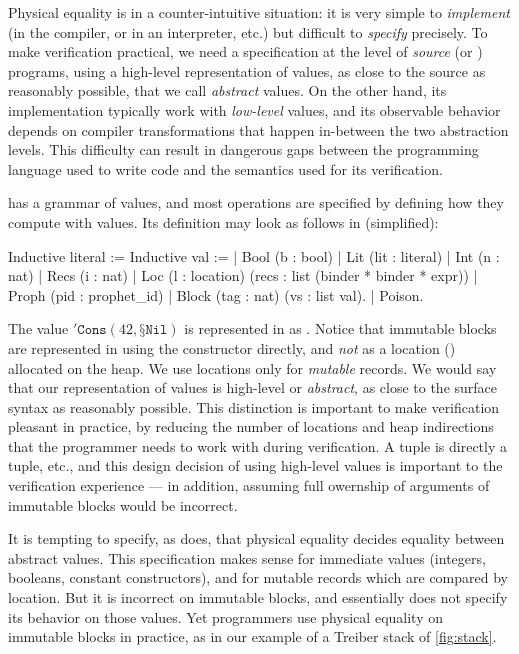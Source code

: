 Physical equality is in a counter-intuitive situation: it is very simple to \emph{implement} (in the \OCaml compiler, or in an interpreter, etc.) but difficult to \emph{specify} precisely. To make verification practical, we need a specification at the level of \emph{source} \OCaml (or \Zoo) programs, using a high-level representation of values, as close to the source as reasonably possible, that we call \emph{abstract} values. On the other hand, its implementation typically work with \emph{low-level} values, and its observable behavior depends on compiler transformations that happen in-between the two abstraction levels.
This difficulty can result in dangerous gaps between the programming language used to write code and the semantics used for its verification.

\ZooLang has a grammar of values, and most operations are specified by defining how they compute with \ZooLang values. Its definition may look as follows in \Rocq (simplified):
\begin{coqcode}
Inductive literal :=            Inductive val :=
 | Bool (b : bool)                | Lit (lit : literal)
 | Int (n : nat)                  | Recs (i : nat)
 | Loc (l : location)                    (recs : list (binder * binder * expr))
 | Proph (pid : prophet_id)       | Block (tag : nat) (vs : list val).
 | Poison.
\end{coqcode}

The value $'\texttt{Cons} (42, \texttt{§}\texttt{Nil})$ is represented in \Rocq as . Notice that immutable blocks are represented in \Rocq using the  constructor directly, and \emph{not} as a location () allocated on the heap. We use locations only for \emph{mutable} records. We would say that our representation of \ZooLang values is high-level or \emph{abstract}, as close to the surface syntax as reasonably possible. This distinction is important to make verification pleasant in practice, by reducing the number of locations and heap indirections that the programmer needs to work with during verification. A \ZooLang tuple is directly a tuple, etc., and this design decision of using high-level values is important to the verification experience --- in addition, assuming full owernship of arguments of immutable blocks would be incorrect.

It is tempting to specify, as \HeapLang does, that physical equality decides equality between abstract values. This specification makes sense for immediate values (integers, booleans, constant constructors), and for mutable records which are compared by location. But it is incorrect on immutable blocks, and \HeapLang essentially does not specify its behavior on those values. Yet programmers use physical equality on immutable blocks in practice, as in our example of a Treiber stack of \cref{fig:stack}.

